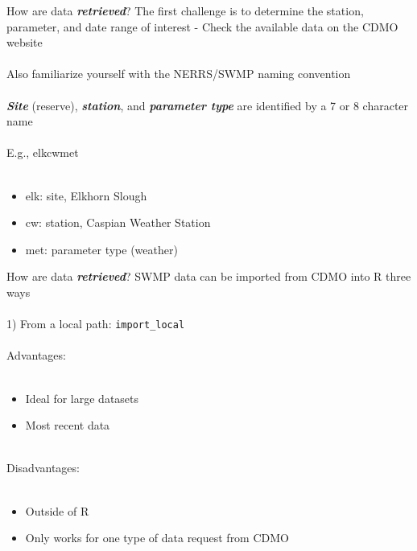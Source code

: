 \documentclass[serif]{beamer}\usepackage[]{graphicx}\usepackage[]{color}
\newcommand{\Bigtxt}[1]{\textbf{\textit{#1}}}
\begin{document}
\begin{frame}{How are data \Bigtxt{retrieved}?}
The first challenge is to determine the station, parameter, and date range of interest - Check the available data on the CDMO website \\~\\
Also familiarize yourself with the NERRS/SWMP naming convention\\~\\  
\Bigtxt{Site} (reserve), \Bigtxt{station}, and \Bigtxt{parameter type} are identified by a 7 or 8 character name \\~\\
E.g., elkcwmet \\~\\
\begin{itemize}
\item elk: site, Elkhorn Slough
\item cw: station, Caspian Weather Station
\item met: parameter type (weather)
\end{itemize}
\end{frame}

\begin{frame}[t]{How are data \Bigtxt{retrieved}?}
SWMP data can be imported from CDMO into R three ways\\~\\
1) From a local path: \texttt{import\_local} \\~\\
Advantages: \\~\\
\begin{itemize}
\item Ideal for large datasets
\item Most recent data \\~\\
\end{itemize}
Disadvantages: \\~\\
\begin{itemize}
\item Outside of R
\item Only works for one type of data request from CDMO
\end{itemize}
\end{frame}
\end{document}
